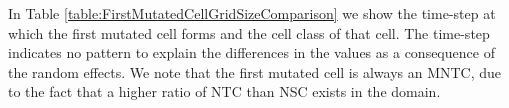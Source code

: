 \documentclass[\main/thesis.tex]{subfiles}
\begin{document}
In Table \ref{table:FirstMutatedCellGridSizeComparison} we show the time-step at which the first mutated cell forms and the cell class of that cell. The time-step indicates no pattern to explain the differences in the values as a consequence of the random effects. We note that the first mutated cell is always an MNTC, due to the fact that a higher ratio of NTC than NSC exists in the domain.
\begin{table}[H]
\centering
{}
\caption{In this table we compare the time-step the first mutated cell forms and the cell class that cell belongs to between the different grid sizes.}
\label{table:FirstMutatedCellGridSizeComparison} 
\end{table}
\end{document}
